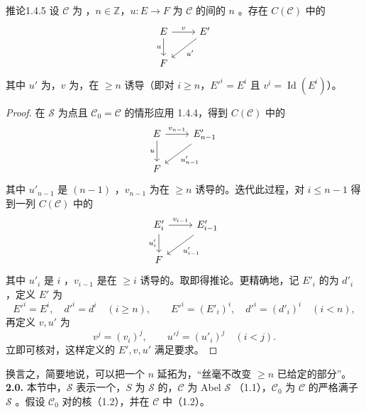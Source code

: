 \begin{SGAresult}{推论}{1.4.5}
设 $\mathscr C$ 为 ，$n\in\mathbb Z$，$u:E\to F$ 为 $\mathscr C$ 的间的 $n$ 。存在 $C(\mathscr C)$ 中的
\[\begin{tikzcd}E\arrow[r,"v"]\arrow[d,"u"']&E'\arrow[dl,"u'"]\\F&\end{tikzcd}\]
其中 $u'$ 为，$v$ 为，在 $\geq n$ 诱导（即对 $i\geq n$，$E'^i=E^i$ 且 $v^i=\operatorname{Id}(E^i)$）。
\end{SGAresult}
\begin{proof}
在 $\mathscr S$ 为点且 $\mathscr C_0=\mathscr C$ 的情形应用 1.4.4，得到 $C(\mathscr C)$ 中的
\[\begin{tikzcd}E\arrow[r,"v_{n-1}"]\arrow[d,"u"']&E'_{n-1}\arrow[dl,"u'_{n-1}"]\\F&\end{tikzcd}\]
其中 $u'_{n-1}$ 是 $(n-1)$ ，$v_{n-1}$ 为在 $\geq n$ 诱导的。迭代此过程，对 $i\leq n-1$ 得到一列 $C(\mathscr C)$ 中的
\[\begin{tikzcd}E'_i\arrow[r,"v_{i-1}"]\arrow[d,"u'_i"']&E'_{i-1}\arrow[dl,"u'_{i-1}"]\\F&\end{tikzcd}\]
其中 $u'_i$ 是 $i$ ，$v_{i-1}$ 是在 $\geq i$ 诱导的。取即得推论。更精确地，记 $E'_i$ 的为 $d'_i$，定义 $E'$ 为
\[E'^i=E^i,\quad d'^i=d^i\quad(i\geq n),\qquad E'^i=(E'_i)^i,\quad d'^i=(d'_i)^i\quad(i<n),\]
再定义 $v,u'$ 为
\[v^j=(v_i)^j,\qquad u'^j=(u'_i)^j\quad(i<j).\]
立即可核对，这样定义的 $E',v,u'$ 满足要求。
\end{proof}
换言之，简要地说，可以把一个 $n$ 延拓为，“丝毫不改变 $\geq n$ 已给定的部分”。
\textbf{2.0.} 本节中，$\mathscr S$ 表示一个，$S$ 为 $\mathscr S$ 的，$\mathscr C$ 为 Abel $\mathscr S$ （1.1），$\mathscr C_0$ 为 $\mathscr C$ 的严格满子 $\mathscr S$ 。假设 $\mathscr C_0$ 对的核（1.2），并在 $\mathscr C$ 中（1.2）。
